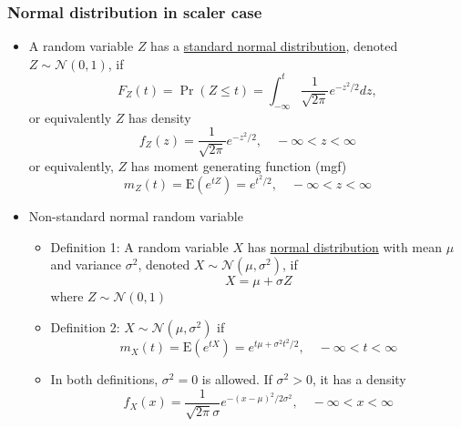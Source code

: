 \subsubsection*{Normal distribution in scaler case}
\begin{itemize}
	\item A random variable $Z$ has a \underline{standard normal distribution}, denoted $Z \sim \mathcal{N}(0, 1)$, if
	$$
	F_Z(t) = \Pr(Z \le t) = \int_{-\infty}^t \frac{1}{\sqrt{2\pi}}e^{-z^2/2}dz,
	$$
	or equivalently $Z$ has density
	$$
	f_Z(z) = \frac{1}{\sqrt{2\pi}}e^{-z^2/2}, \quad -\infty < z < \infty
	$$
	or equivalently, $Z$ has moment generating function (mgf)
	$$
	m_Z(t) = \mbox{E}(e^{tZ}) = e^{t^2/2}, \quad -\infty < z < \infty
	$$
	\item Non-standard normal random variable
	\begin{itemize}
		\item Definition 1: A random variable $X$ has \underline{normal distribution} with mean $\mu$ and variance $\sigma^2$, denoted $X \sim \mathcal{N}(\mu, \sigma^2)$, if
		$$
		X = \mu + \sigma Z
		$$
		where $Z \sim \mathcal{N}(0, 1)$
		\item Definition 2:  $X \sim \mathcal{N}(\mu, \sigma^2)$ if
		$$
		m_X(t) = \mbox{E}(e^{tX}) = e^{t\mu + \sigma^2 t^2 / 2}, \quad -\infty < t < \infty
		$$
		\item In both definitions, $\sigma^2 = 0$ is allowed. If $\sigma^2 > 0$, it has a density
		$$
		f_X(x) = \frac{1}{\sqrt{2 \pi}\sigma}e^{-(x - \mu)^2 / 2 \sigma^2}, \quad -\infty < x < \infty
		$$
	\end{itemize}


\end{itemize}

